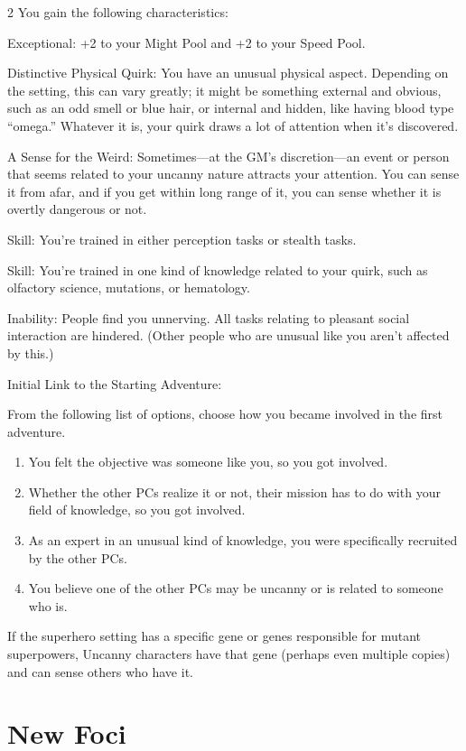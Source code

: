 \begin{multicols}{2}
You gain the following characteristics:

Exceptional: +2 to your Might Pool and +2 to your Speed Pool.

Distinctive Physical Quirk: You have an unusual physical aspect. Depending on the setting, this can vary greatly; it might be something external and obvious, such as an odd smell or blue hair, or internal and hidden, like having blood type “omega.” Whatever it is, your quirk draws a lot of attention when it’s discovered.

A Sense for the Weird: Sometimes—at the GM’s discretion—an event or person that seems related to your uncanny nature attracts your attention. You can sense it from afar, and if you get within long range of it, you can sense whether it is overtly dangerous or not.

Skill: You’re trained in either perception tasks or stealth tasks.

Skill: You’re trained in one kind of knowledge related to your quirk, such as olfactory science, mutations, or hematology.

Inability: People find you unnerving. All tasks relating to pleasant social interaction are hindered. (Other people who are unusual like you aren’t affected by this.)

Initial Link to the Starting Adventure:

From the following list of options, choose how you became involved in the first adventure.

\begin{enumerate}
\item You felt the objective was someone like you, so you got involved.
\item Whether the other PCs realize it or not, their mission has to do with your field of knowledge, so you got involved.
\item As an expert in an unusual kind of knowledge, you were specifically recruited by the other PCs.
\item You believe one of the other PCs may be uncanny or is related to someone who is.
\end{enumerate}

If the superhero setting has a specific gene or genes responsible for mutant superpowers, Uncanny characters have that gene (perhaps even multiple copies) and can sense others who have it.

\section{New Foci}


\end{multicols}
